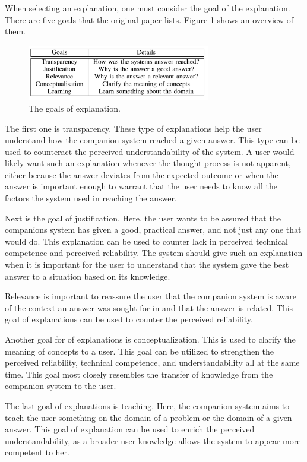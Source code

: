 \documentclass[a4paper]{article}
\begin{document}
When selecting an explanation, one must consider the goal of the explanation. There are five goals that the original paper lists. Figure \ref{fig:goals} shows an overview of them.

\begin{figure}[H]
	\centering
	\includegraphics[width=8cm]{goals.png}
	\caption{The goals of explanation.}
	\label{fig:goals}
\end{figure}

The first one is transparency. These type of explanations help the user understand how the companion system reached a given answer. This type can be used to counteract the perceived understandability of the system. A user would likely want such an explanation whenever the thought process is not apparent, either because the answer deviates from the expected outcome or when the answer is important enough to warrant that the user needs to know all the factors the system used in reaching the answer.

Next is the goal of justification. Here, the user wants to be assured that the companions system has given a good, practical answer, and not just any one that would do. This explanation can be used to counter lack in perceived technical competence and perceived reliability. The system should give such an explanation when it is important for the user to understand that the system gave the best answer to a situation based on its knowledge.

Relevance is important to reassure the user that the companion system is aware of the context an answer was sought for in and that the answer is related. This goal of explanations can be used to counter the perceived reliability.

Another goal for of explanations is conceptualization. This is used to clarify the meaning of concepts to a user. This goal can be utilized to strengthen the perceived reliability, technical competence, and understandability all at the same time. This goal most closely resembles the transfer of knowledge from the companion system to the user.

The last goal of explanations is teaching. Here, the companion system aims to teach the user something on the domain of a problem or the domain of a given answer. This goal of explanation can be used to enrich the perceived understandability, as a broader user knowledge allows the system to appear more competent to her.
\end{document}
